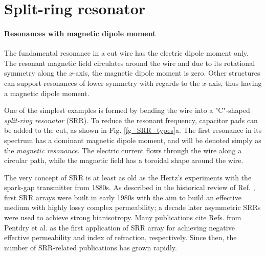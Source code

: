 \FloatBarrier %
\section{Split-ring resonator} \label{section_srr} %
\paragraph{Resonances with magnetic dipole moment}%
The fundamental resonance in a cut wire has the electric dipole moment only. The resonant magnetic field circulates around the wire and due to its rotational symmetry along the $x$-axis, the magnetic dipole moment is zero. Other structures can support resonances of lower symmetry with regards to the $x$-axis, thus having a magnetic dipole moment.

One of the simplest examples is formed by bending the wire into a "C"-shaped \textit{split-ring resonator} (SRR). To reduce the resonant frequency, capacitor pads can be added to the cut, as shown in Fig. \ref{fg_SRR_types}a. The first resonance in its spectrum has a dominant magnetic dipole moment, and will be denoted simply as the \textit{magnetic resonance}. The electric current flows through the wire along a circular path, while the magnetic field has a toroidal shape around the wire.   

The very concept of SRR is at least as old as the Hertz's experiments with the spark-gap transmitter from 1880s.
As described in the historical review of Ref. \cite[pp. 120--126]{solymar2009waves}, first SRR arrays were built in early 1980s with the aim to build an effective medium with highly lossy complex permeability; a decade later asymmetric SRRs were used to achieve strong bianisotropy. Many publications cite Refs. \cite{pendry1999magnetism,pendry2000negative} from Pentdry et al. as the first application of SRR array for achieving negative effective permeability and index of refraction, respectively. Since then, the number of SRR-related publications has grown rapidly. 
\label{negn_srr}

